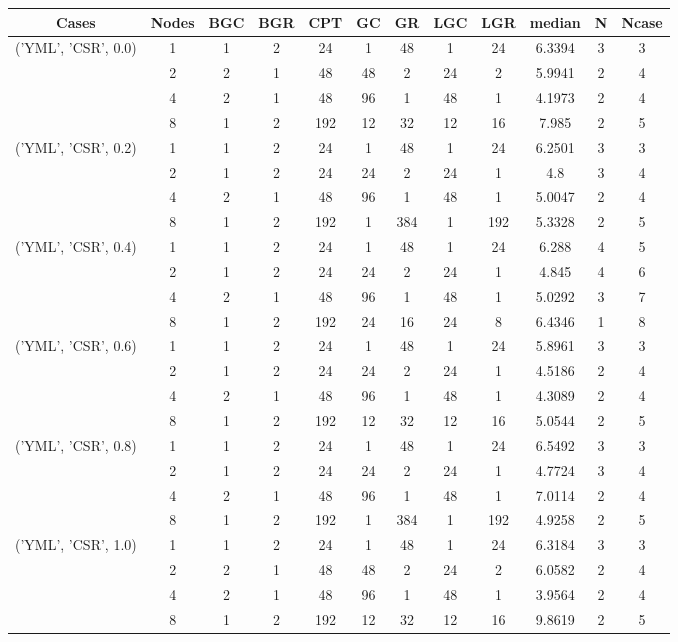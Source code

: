 \begin{tabular}{cccccccccccc}
\hline
Cases & Nodes& BGC& BGR& CPT& GC& GR& LGC& LGR& median & N & Ncase \\
\hline
\multirow{4}{*}{('YML', 'CSR', 0.0)}& 1& 1& 2& 24& 1& 48& 1& 24& 6.3394& 3& 3\\
& 2& 2& 1& 48& 48& 2& 24& 2& 5.9941& 2& 4\\
& 4& 2& 1& 48& 96& 1& 48& 1& 4.1973& 2& 4\\
& 8& 1& 2& 192& 12& 32& 12& 16& 7.985& 2& 5\\
\hline
\multirow{4}{*}{('YML', 'CSR', 0.2)}& 1& 1& 2& 24& 1& 48& 1& 24& 6.2501& 3& 3\\
& 2& 1& 2& 24& 24& 2& 24& 1& 4.8& 3& 4\\
& 4& 2& 1& 48& 96& 1& 48& 1& 5.0047& 2& 4\\
& 8& 1& 2& 192& 1& 384& 1& 192& 5.3328& 2& 5\\
\hline
\multirow{4}{*}{('YML', 'CSR', 0.4)}& 1& 1& 2& 24& 1& 48& 1& 24& 6.288& 4& 5\\
& 2& 1& 2& 24& 24& 2& 24& 1& 4.845& 4& 6\\
& 4& 2& 1& 48& 96& 1& 48& 1& 5.0292& 3& 7\\
& 8& 1& 2& 192& 24& 16& 24& 8& 6.4346& 1& 8\\
\hline
\multirow{4}{*}{('YML', 'CSR', 0.6)}& 1& 1& 2& 24& 1& 48& 1& 24& 5.8961& 3& 3\\
& 2& 1& 2& 24& 24& 2& 24& 1& 4.5186& 2& 4\\
& 4& 2& 1& 48& 96& 1& 48& 1& 4.3089& 2& 4\\
& 8& 1& 2& 192& 12& 32& 12& 16& 5.0544& 2& 5\\
\hline
\multirow{4}{*}{('YML', 'CSR', 0.8)}& 1& 1& 2& 24& 1& 48& 1& 24& 6.5492& 3& 3\\
& 2& 1& 2& 24& 24& 2& 24& 1& 4.7724& 3& 4\\
& 4& 2& 1& 48& 96& 1& 48& 1& 7.0114& 2& 4\\
& 8& 1& 2& 192& 1& 384& 1& 192& 4.9258& 2& 5\\
\hline
\multirow{4}{*}{('YML', 'CSR', 1.0)}& 1& 1& 2& 24& 1& 48& 1& 24& 6.3184& 3& 3\\
& 2& 2& 1& 48& 48& 2& 24& 2& 6.0582& 2& 4\\
& 4& 2& 1& 48& 96& 1& 48& 1& 3.9564& 2& 4\\
& 8& 1& 2& 192& 12& 32& 12& 16& 9.8619& 2& 5\\
\hline
\end{tabular}
